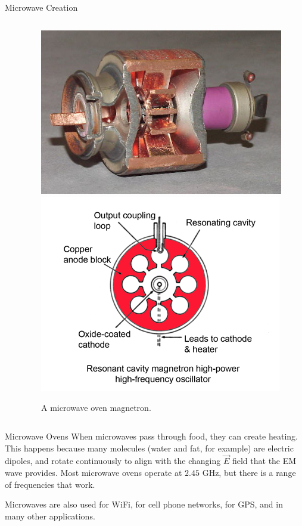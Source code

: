 \documentclass{beamer}
\begin{document}
\begin{frame}{Microwave Creation}
\begin{columns}
\begin{column}{.6\textwidth}
	\end{column}	
	\begin{column}{.4\textwidth}
	    \begin{figure}
	    \centering
	    \includegraphics[scale=.3]{magnetron1.jpg}
	    \vspace{1mm}
        \includegraphics[scale=1]{magnetron2.png} 
	    \caption{A microwave oven magnetron.}
	    \label{fig:rotarycap}
	    \end{figure}
	\end{column}
	\end{columns}
\end{frame}

\begin{frame}{Microwave Ovens}
    When microwaves pass through food, they can create heating. This happens because many molecules (water and fat, for example) are electric dipoles, and rotate continuously to align with the changing $\vec{E}$ field that the EM wave provides. Most microwave ovens operate at $2.45$ GHz, but there is a range of frequencies that work.\vspace{5mm}
    
    Microwaves are also used for WiFi, for cell phone networks, for GPS, and in many other applications. 
\end{frame}
\end{document}
